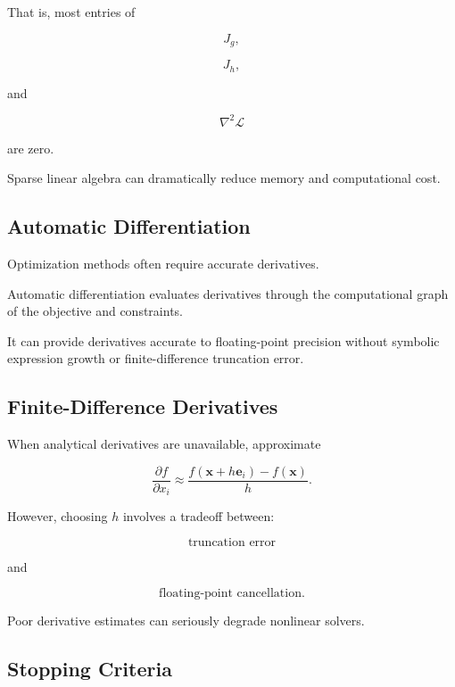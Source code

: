 That is, most entries of

\[
\boxed{
J_g,
}
\]

\[
\boxed{
J_h,
}
\]

and

\[
\boxed{
\nabla^2\mathcal{L}
}
\]

are zero.

Sparse linear algebra can dramatically reduce memory and computational
cost.

\subsection{Automatic Differentiation}
\label{subsec:nlp-automatic-differentiation}

Optimization methods often require accurate derivatives.

Automatic differentiation evaluates derivatives through the computational
graph of the objective and constraints.

It can provide derivatives accurate to floating-point precision without
symbolic expression growth or finite-difference truncation error.

\subsection{Finite-Difference Derivatives}
\label{subsec:nlp-finite-difference-derivatives}

When analytical derivatives are unavailable, approximate

\[
\boxed{
\frac{\partial f}{\partial x_i}
\approx
\frac{
f(\mathbf{x}+h\mathbf{e}_i)
-
f(\mathbf{x})
}{
h
}.
}
\]

However, choosing \(h\) involves a tradeoff between:

\[
\boxed{
\text{truncation error}
}
\]

and

\[
\boxed{
\text{floating-point cancellation}.
}
\]

Poor derivative estimates can seriously degrade nonlinear solvers.

\subsection{Stopping Criteria}
\label{subsec:nlp-stopping-criteria}

